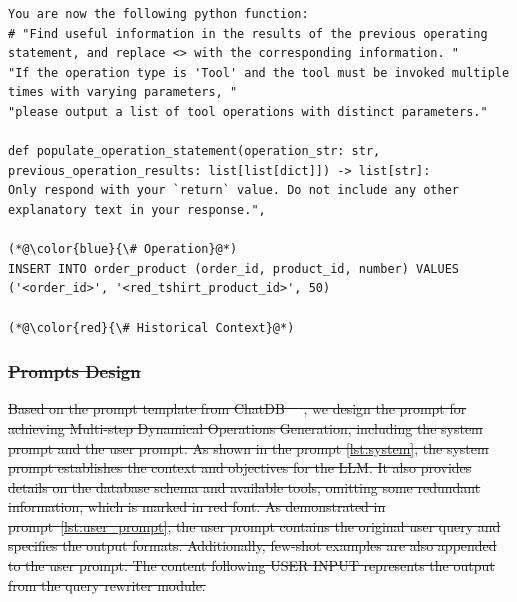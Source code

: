 \documentclass[preprint,12pt]{elsarticle}
\providecommand{\DIFdeltex}[1]{{\protect\color{red}\sout{#1}}}                      %
\providecommand{\DIFaddend}{} %
\providecommand{\DIFdelbegin}{} %
\providecommand{\DIFdelend}{} %
\providecommand{\DIFdel}[1]{\texorpdfstring{\DIFdeltex{#1}}{}} %
\newcommand{\DIFscaledelfig}{0.5}
\newlength{\DIFdelgraphicswidth} %
\newlength{\DIFdelgraphicsheight} %
\newcommand{\DIFdelincludegraphics}[2][]{%
\sbox{\DIFdelgraphicsbox}{\DIFOincludegraphics[#1]{#2}}%
\settoboxwidth{\DIFdelgraphicswidth}{\DIFdelgraphicsbox} %
\settoboxtotalheight{\DIFdelgraphicsheight}{\DIFdelgraphicsbox} %
\scalebox{\DIFscaledelfig}{%
\parbox[b]{\DIFdelgraphicswidth}{\usebox{\DIFdelgraphicsbox}\\[-\baselineskip] \rule{\DIFdelgraphicswidth}{0em}}\llap{\resizebox{\DIFdelgraphicswidth}{\DIFdelgraphicsheight}{%
\setlength{\unitlength}{\DIFdelgraphicswidth}%
\begin{picture}(1,1)%
\thicklines\linethickness{2pt} %
{\color[rgb]{1,0,0}\put(0,0){\framebox(1,1){}}}%
{\color[rgb]{1,0,0}\put(0,0){\line( 1,1){1}}}%
{\color[rgb]{1,0,0}\put(0,1){\line(1,-1){1}}}%
\end{picture}%
}\hspace*{3pt}}} %
} %
\DeclareRobustCommand{\DIFaddend}{\DIFOaddend \let\includegraphics\DIFOincludegraphics} %
\DeclareRobustCommand{\DIFdelbegin}{\DIFOdelbegin \let\includegraphics\DIFdelincludegraphics} %
\DeclareRobustCommand{\DIFdelend}{\DIFOaddend \let\includegraphics\DIFOincludegraphics} %
\begin{document}
\DIFaddend \begin{lstlisting}[style=prompt, label={lst:param_prompt},caption={Parameters Identification prompt},numberstyle=\scriptsize,aboveskip=0pt, belowskip=0pt]
You are now the following python function: 
# "Find useful information in the results of the previous operating statement, and replace <> with the corresponding information. "
"If the operation type is 'Tool' and the tool must be invoked multiple times with varying parameters, "
"please output a list of tool operations with distinct parameters."
        
def populate_operation_statement(operation_str: str, previous_operation_results: list[list[dict]]) -> list[str]:
Only respond with your `return` value. Do not include any other explanatory text in your response.",

(*@\color{blue}{\# Operation}@*)
INSERT INTO order_product (order_id, product_id, number) VALUES ('<order_id>', '<red_tshirt_product_id>', 50)

(*@\color{red}{\# Historical Context}@*)
\end{lstlisting}
\DIFdelbegin \subsubsection{\DIFdel{Prompts Design}}
\addtocounter{subsubsection}{-1}%
\DIFdel{Based on the prompt template from ChatDB~\mbox{%
\cite{hu2023chatdb}}\hspace{0pt}%
, we design the prompt for achieving Multi-step Dynamical Operations Generation, including the system prompt and the user prompt.
As shown in the prompt \ref{lst:system}, the system prompt establishes the context and objectives for the LLM. 
It also provides details on the database schema and available tools, omitting some redundant information, which is marked in red font.
As demonstrated in prompt~\ref{lst:user_prompt}, the user prompt contains the original user query and specifies the output formats.
Additionally, few-shot examples are also appended to the user prompt.
The content following USER INPUT represents the output from the query rewriter module.
}\DIFdelend 
\end{document}
